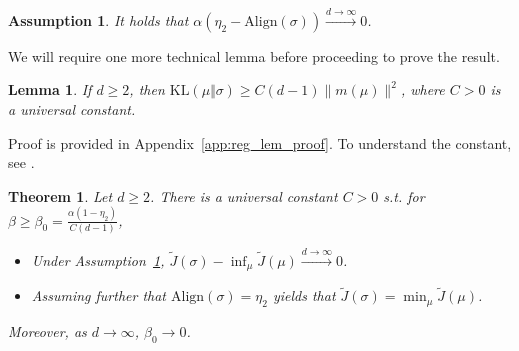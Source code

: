 \documentclass{article}
\newtheorem{theorem}{Theorem}
\newtheorem{assumption}{Assumption}
\newtheorem{lemma}{Lemma}
\newcommand{\KL}{\mathrm{KL}}
\begin{document}
\begin{assumption}
\label{assump:alignment}
It holds that  $\alpha(\eta_2 - \mathrm{Align}(\sigma))\xrightarrow{d\to\infty} 0$.


\end{assumption}
We will require one more technical lemma before proceeding to prove the result.
\begin{lemma}\label{lem:lb_kl}
If $d\geq 2$, then $\KL(\mu\Vert\sigma)\geq C(d-1)\|m(\mu)\|^2$, where $C>0$ is a universal constant.
\end{lemma}
Proof is provided in Appendix~\ref{app:reg_lem_proof}. To understand the constant, see \citep[Proposition~2.6.1]{vershynin2018high}.

\begin{theorem}\label{thm:regularized main}
    Let $d\geq 2$. There is a universal constant $C>0$ s.t. for $\beta \geq \beta_0 = \frac{\alpha(1-\eta_2)}{C(d-1)}$,
    \begin{itemize}
        \item 
        Under Assumption~\ref{assump:alignment}, $\tilde{J}(\sigma)- \inf_\mu\tilde{J}(\mu)\xrightarrow{d\to\infty} 0$.
        \item 
        Assuming further that $\mathrm{Align}(\sigma)=\eta_2$ yields that $\tilde{J}(\sigma) = \min_{\mu}\tilde{J}(\mu)$.        
    \end{itemize}
    
    Moreover, as $d\to\infty$, $\beta_0\to 0$.
\end{theorem}
\end{document}

